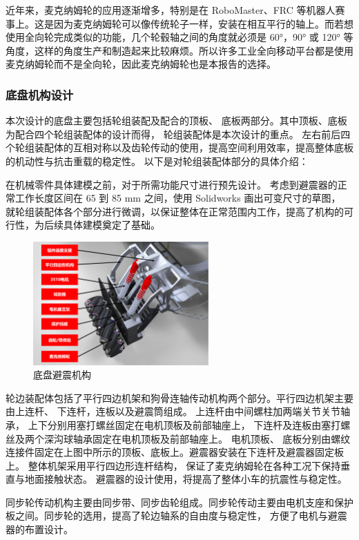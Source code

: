 近年来，麦克纳姆轮的应用逐渐增多，特别是在 RoboMaster、FRC 等机器人赛事上。这是因为麦克纳姆轮可以像传统轮子一样，安装在相互平行的轴上。而若想使用全向轮完成类似的功能，几个轮毂轴之间的角度就必须是 60°，90° 或 120° 等角度，这样的角度生产和制造起来比较麻烦。所以许多工业全向移动平台都是使用麦克纳姆轮而不是全向轮，因此麦克纳姆轮也是本报告的选择。

\subsubsection{底盘机构设计}

本次设计的底盘主要包括轮组装配及配合的顶板、 底板两部分。其中顶板、底板为配合四个轮组装配体的设计而得， 轮组装配体是本次设计的重点。 左右前后四个轮组装配体的互相对称以及齿轮传动的使用，提高空间利用效率，提高整体底板的机动性与抗击重载的稳定性。 以下是对轮组装配体部分的具体介绍：

在机械零件具体建模之前，对于所需功能尺寸进行预先设计。 考虑到避震器的正常工作长度区间在 65 到 85 mm 之间，使用 Solidworks 画出可变尺寸的草图， 就轮组装配体各个部分进行微调，以保证整体在正常范围内工作，提高了机构的可行性，为后续具体建模奠定了基础。

\begin{figure}[htbp]
	\centering
	\includegraphics[width = 0.6\textwidth]{fig/dplb.png}
	\caption{底盘避震机构}
	\label{dplb}
\end{figure}

轮边装配体包括了平行四边机架和狗骨连轴传动机构两个部分。平行四边机架主要由上连杆、 下连杆，连板以及避震筒组成。 上连杆由中间螺柱加两端关节关节轴承， 上下分别用塞打螺丝固定在电机顶板及前部轴座上， 下连杆及连板由塞打螺丝及两个深沟球轴承固定在电机顶板及前部轴座上。 电机顶板、 底板分别由螺纹连接件固定在上图中所示的顶板、底板上。避震器安装在下连杆及避震器固定板上。 整体机架采用平行四边形连杆结构， 保证了麦克纳姆轮在各种工况下保持垂直与地面接触状态。 避震器的设计使用，将提高了整体小车的抗震性与稳定性。

同步轮传动机构主要由同步带、同步齿轮组成。同步轮传动主要由电机支座和保护板之间。同步轮的选用，提高了轮边轴系的自由度与稳定性， 方便了电机与避震器的布置设计。

